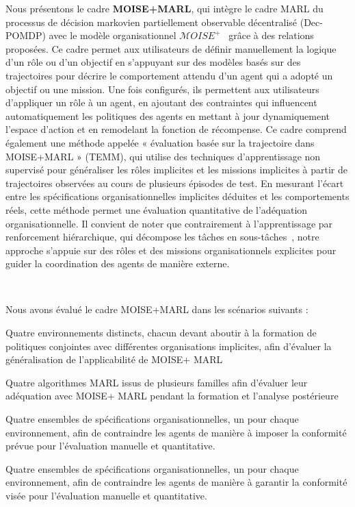 \noindent Nous présentons le cadre \textbf{MOISE+MARL}, qui intègre le cadre MARL du processus de décision markovien partiellement observable décentralisé (Dec-POMDP) avec le modèle organisationnel $\mathcal{M}OISE^+$~\cite{Hubner2007} grâce à des relations proposées. Ce cadre permet aux utilisateurs de définir manuellement la logique d'un rôle ou d'un objectif en s'appuyant sur des modèles basés sur des trajectoires pour décrire le comportement attendu d'un agent qui a adopté un objectif ou une mission. Une fois configurés, ils permettent aux utilisateurs d'appliquer un rôle à un agent, en ajoutant des contraintes qui influencent automatiquement les politiques des agents en mettant à jour dynamiquement l'espace d'action et en remodelant la fonction de récompense. Ce cadre comprend également une méthode appelée « évaluation basée sur la trajectoire dans MOISE+MARL » (TEMM), qui utilise des techniques d'apprentissage non supervisé pour généraliser les rôles implicites et les missions implicites à partir de trajectoires observées au cours de plusieurs épisodes de test. En mesurant l'écart entre les spécifications organisationnelles implicites déduites et les comportements réels, cette méthode permet une évaluation quantitative de l'adéquation organisationnelle. Il convient de noter que contrairement à l'apprentissage par renforcement hiérarchique, qui décompose les tâches en sous-tâches~\cite{Qi2024, Matsuyama2025, SaoMai2024}, notre approche s'appuie sur des rôles et des missions organisationnels explicites pour guider la coordination des agents de manière externe.

\

Nous avons évalué le cadre MOISE+MARL dans les scénarios suivants :
\begin{enumerate*}[label={\roman*) },itemjoin={; \quad}]
    \item Quatre environnements distincts, chacun devant aboutir à la formation de politiques conjointes avec différentes organisations implicites, afin d'évaluer la généralisation de l'applicabilité de MOISE+ MARL
    \item Quatre algorithmes MARL issus de plusieurs familles afin d'évaluer leur adéquation avec MOISE+ MARL pendant la formation et l'analyse postérieure
    \item Quatre ensembles de spécifications organisationnelles, un pour chaque environnement, afin de contraindre les agents de manière à imposer la conformité prévue pour l'évaluation manuelle et quantitative.
    \item Quatre ensembles de spécifications organisationnelles, un pour chaque environnement, afin de contraindre les agents de manière à garantir la conformité visée pour l'évaluation manuelle et quantitative.
\end{enumerate*}


